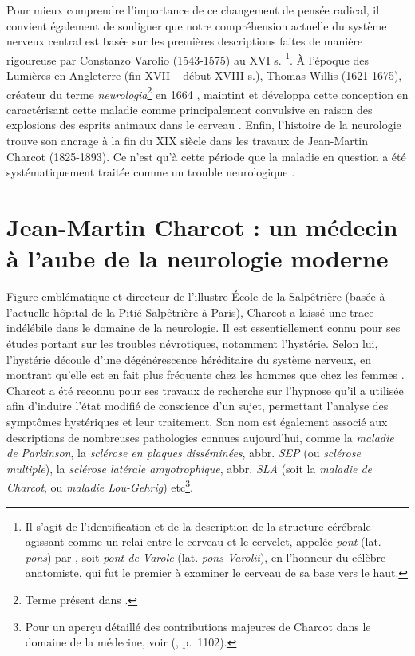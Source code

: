 Pour mieux comprendre l'importance de ce changement de pensée radical, il convient également de souligner que notre compréhension actuelle du système nerveux central est basée sur les premières descriptions faites de manière rigoureuse par Constanzo Varolio (1543-1575) au XVI\ieme{} s. \citep[p.~734]{tubbs2008costanzo}\footnote{Il s'agit de l'identification et de la description de la structure cérébrale agissant comme un relai entre le cerveau et le cervelet, appelée \textit{pont} (lat. \textit{pons}) par \citet{varolio1969nervis}, soit \textit{pont de Varole} (lat. \textit{pons Varolii}), en l'honneur du célèbre anatomiste, qui fut le premier à examiner le cerveau de sa base vers le haut.  
}. À l'époque des Lumières en Angleterre (fin XVII\ieme{} -- début XVIII\ieme{} s.), Thomas Willis (1621-1675), créateur du terme \textit{neurologia}\footnote{Terme présent dans \citet{willis1664cerebri}.} en 1664 \citep[p.~2]{monteiro2021}, maintint et développa cette conception en caractérisant cette maladie comme principalement convulsive en raison des explosions des \og{}esprits animaux\fg{} dans le cerveau \citep[p.~1]{willis1681essay}. Enfin, l'histoire de la neurologie trouve son ancrage à la fin du XIX\ieme{} siècle dans les travaux de Jean-Martin Charcot (1825-1893). Ce n'est qu'à cette période que la maladie en question a été systématiquement traitée comme un trouble neurologique \citep[p.~114]{tasca2012women}. 

\section{Jean-Martin Charcot : un médecin à l'aube de la neurologie moderne}
\label{JMC_polymathe}

Figure emblématique et directeur de l'illustre École de la Salpêtrière (basée à l'actuelle hôpital de la Pitié-Salpêtrière à Paris), Charcot a laissé une trace indélébile dans le domaine de la neurologie. 
Il est essentiellement connu pour ses études portant sur les troubles névrotiques, notamment l'hystérie. Selon lui, l'hystérie découle d'une dégénérescence héréditaire du système nerveux, en montrant qu'elle est en fait plus fréquente chez les hommes que chez les femmes \citep[p.~114]{tasca2012women}. Charcot a été reconnu pour ses travaux de recherche sur l'hypnose qu'il a utilisée afin d'induire l'état modifié de conscience d'un sujet, permettant l'analyse des symptômes hystériques et leur traitement. 
Son nom est également associé aux descriptions de nombreuses pathologies connues aujourd'hui, comme la \textit{maladie de Parkinson}, la \textit{sclérose en plaques disséminées}, abbr. \textit{SEP} (ou \textit{sclérose multiple}), la \textit{sclérose latérale amyotrophique}, abbr. \textit{SLA} (soit la \textit{maladie de Charcot}, ou \textit{maladie Lou-Gehrig}) etc\footnote{Pour un aperçu détaillé des contributions majeures de Charcot dans le domaine de la médecine, voir \citeauthor{camargo2023} (\citeyear{camargo2023}, p.~1102).}.

